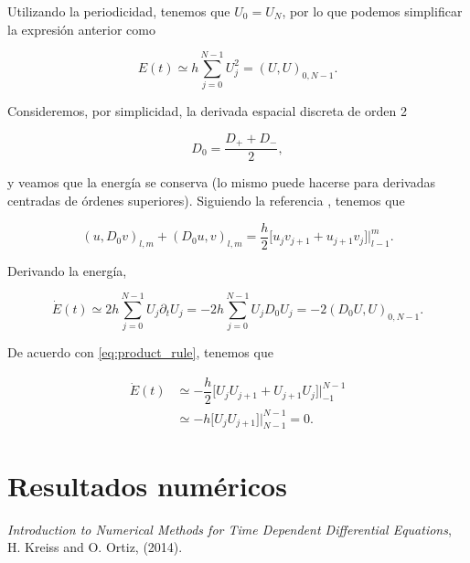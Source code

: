 \documentclass[12pt]{article}
\begin{document}
Utilizando la periodicidad, tenemos que $U_0 = U_N$, por lo que podemos simplificar la expresi\'on anterior como

\begin{equation}
E(t) \simeq h\sum_{j=0}^{N-1} U_j^2 = (U,U)_{0,N-1}.
\end{equation}

Consideremos, por simplicidad, la derivada espacial discreta de orden 2 

\begin{equation}
D_0 = \dfrac{D_+ + D_-}{2},
\end{equation}

y veamos que la energ\'ia se conserva (lo mismo puede hacerse para derivadas centradas de \'ordenes superiores). Siguiendo la referencia \cite{Kreiss-Ortiz}, tenemos que 

\begin{equation} \label{eq:product_rule}
(u, D_0 v)_{l,m} + (D_0 u, v)_{l,m} = \dfrac{h}{2} \bigg[ u_j v_{j+1} + u_{j+1} v_j \bigg]\bigg|_{l-1}^m.
\end{equation}

Derivando la energ\'ia,

\begin{equation}
\dot{E}(t) \simeq 2 h \sum_{j=0}^{N-1} U_j \partial_t U_j = -2 h \sum_{j=0}^{N-1} U_j D_0 U_j = -2 (D_0 U, U)_{0,N-1}.
\end{equation}

De acuerdo con \ref{eq:product_rule}, tenemos que 

\begin{align}
\dot{E}(t) &\simeq -\dfrac{h}{2}  \bigg[ U_j U_{j+1} + U_{j+1} U_j \bigg]\bigg|_{-1}^{N-1} \\
&\simeq -h   \bigg[ U_j U_{j+1}\bigg]\bigg|_{N-1}^{N-1} = 0.
\end{align}

\section{Resultados num\'ericos}



\begin{thebibliography}{1}

 {\em Introduction to Numerical Methods for Time Dependent Differential Equations}, H. Kreiss and O. Ortiz, (2014).

\end{thebibliography}
\end{document}
